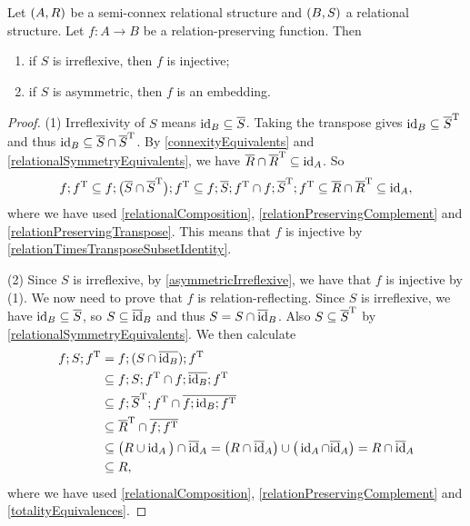 \begin{lemma} \label{relationPreservingFunctionFromSemiConnexStructure}
Let $\sSet{A, R}$ be a semi-connex relational structure and $\sSet{B, S}$ a relational structure. Let $f:A\to B$ be a relation-preserving function. Then
\begin{enumerate}
\item if $S$ is irreflexive, then $f$ is injective;
\item if $S$ is asymmetric, then $f$ is an embedding.
\end{enumerate}
\end{lemma}
\begin{proof}
(1) Irreflexivity of $S$ means $\operatorname{id}_B\subseteq \overline{S}$. Taking the transpose gives $\operatorname{id}_B \subseteq \overline{S}^{\mathrm{T}}$ and thus $\operatorname{id}_B\subseteq \overline{S}\cap \overline{S}^{\mathrm{T}}$. By \ref{connexityEquivalents} and \ref{relationalSymmetryEquivalents}, we have $\overline{R} \cap \overline{R}^{\mathrm{T}} \subseteq \operatorname{id}_A$. So
\[ f;f^{\mathrm{T}} \subseteq f;\big(\overline{S}\cap\overline{S}^{\mathrm{T}}\big);f^{\mathrm{T}} \subseteq f;\overline{S};f^{\mathrm{T}} \cap f;\overline{S}^{\mathrm{T}};f^{\mathrm{T}} \subseteq \overline{R} \cap \overline{R}^{\mathrm{T}} \subseteq \operatorname{id}_A, \]
where we have used \ref{relationalComposition}, \ref{relationPreservingComplement} and \ref{relationPreservingTranspose}. This means that $f$ is injective by \ref{relationTimesTransposeSubsetIdentity}.

(2) Since $S$ is irreflexive, by \ref{asymmetricIrreflexive}, we have that $f$ is injective by (1). We now need to prove that $f$ is relation-reflecting. Since $S$ is irreflexive, we have $\operatorname{id}_B\subseteq \overline{S}$, so $S\subseteq \overline{\operatorname{id}}_B$ and thus $S= S\cap \overline{\operatorname{id}}_B$. Also $S\subseteq \overline{S}^{\mathrm{T}}$ by \ref{relationalSymmetryEquivalents}.
We then calculate
\begin{align*}
f;S;f^{\mathrm{T}} &= f;(S\cap \overline{\operatorname{id}_B});f^{\mathrm{T}} \\
&\subseteq f;S;f^{\mathrm{T}} \cap f;\overline{\operatorname{id}_B};f^{\mathrm{T}} \\
&\subseteq f;\overline{S}^{\mathrm{T}};f^{\mathrm{T}} \cap \overline{f;\operatorname{id}_B;f^{\mathrm{T}}} \\
&\subseteq \overline{R}^{\mathrm{T}} \cap \overline{f;f^{\mathrm{T}}} \\
&\subseteq \big(R\cup\operatorname{id}_A\big) \cap \overline{\operatorname{id}}_A = \big(R\cap \overline{\operatorname{id}}_A\big) \cup \big(\operatorname{id}_A\cap \overline{\operatorname{id}}_A\big) = R\cap \overline{\operatorname{id}}_A \\
&\subseteq R,
\end{align*}
where we have used \ref{relationalComposition}, \ref{relationPreservingComplement} and \ref{totalityEquivalences}.
\end{proof}

